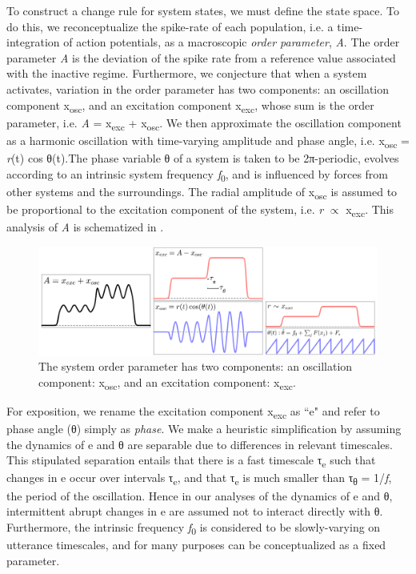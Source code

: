 To construct a change rule for system states, we must define the state space. To do this, we reconceptualize the spike-rate of each population, i.e. a time-integration of action potentials, as a macroscopic \textit{order parameter}, \textit{A}. The order parameter \textit{A} is the deviation of the spike rate from a reference value associated with the inactive regime. Furthermore, we conjecture that when a system activates, variation in the order parameter has two components: an oscillation component x\textsubscript{osc}, and an excitation component x\textsubscript{exc}, whose sum is the order parameter, i.e. \textit{A} = x\textsubscript{exc} + x\textsubscript{osc}. We then approximate the oscillation component as a harmonic oscillation with time-varying amplitude and phase angle, i.e. x\textsubscript{osc} = \textit{r}(t) cos θ(t).The phase variable θ of a system is taken to be 2π{}-periodic, evolves according to an intrinsic system frequency \textit{f}\textsubscript{0}, and is influenced by forces from other systems and the surroundings. The radial amplitude of x\textsubscript{osc} is assumed to be proportional to the excitation component of the system, i.e. \textit{r}  ${\propto}$ x\textsubscript{exc}. This analysis of \textit{A} is schematized in {}.  

  
\begin{figure}
\includegraphics[width=\textwidth]{figures/Tilsen-img12.png}
\caption{The system order parameter has two components: an oscillation component: x\textsubscript{osc}, and an excitation component: x\textsubscript{exc}.}
\label{fig:2:5}
\end{figure}
 

  For exposition, we rename the excitation component x\textsubscript{exc} as ``e" and refer to phase angle (θ) simply as \textit{phase}. We make a heuristic simplification by assuming the dynamics of e and θ are separable due to differences in relevant timescales. This stipulated separation entails that there is a fast timescale τ\textsubscript{e} such that changes in e occur over intervals τ\textsubscript{e}, and that τ\textsubscript{e} is much smaller than τ\textsubscript{θ} = 1/\textit{f}, the period of the oscillation. Hence in our analyses of the dynamics of e and θ, intermittent abrupt changes in e are assumed not to interact directly with θ. Furthermore, the intrinsic frequency \textit{f}\textsubscript{0} is considered to be slowly-varying on utterance timescales, and for many purposes can be conceptualized as a fixed parameter. 

